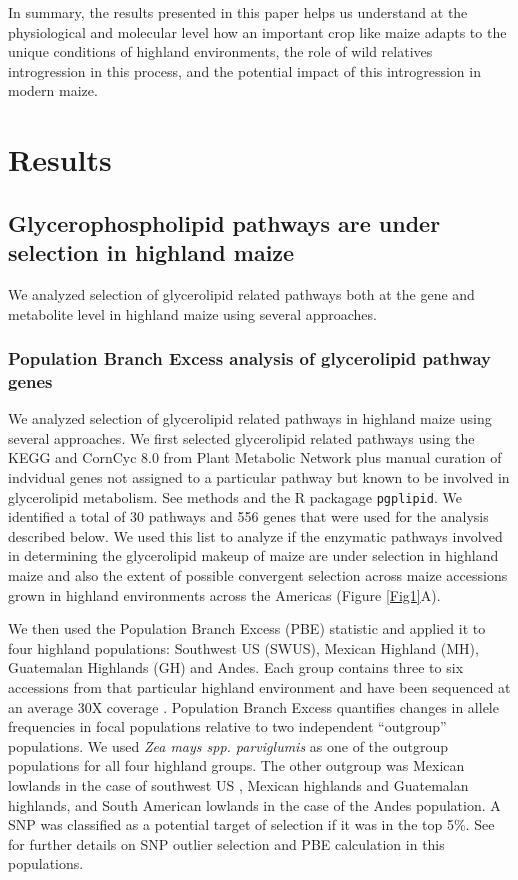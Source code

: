 \documentclass[9pt,twocolumn,twoside,lineno]{gsajnl}
\begin{document}
In summary, the results presented in this paper helps us understand at the physiological and molecular level how an important crop like maize adapts to the unique conditions of highland environments, the role of wild relatives introgression in this process, and the potential impact of this introgression in modern maize.

\section{Results}
\label{sec:results}

\subsection{Glycerophospholipid pathways are under selection in  highland maize} 
We analyzed selection of glycerolipid related pathways both at the gene and metabolite level in highland maize using several approaches. 

\subsubsection{Population Branch Excess analysis of glycerolipid pathway genes} 
We analyzed selection of glycerolipid related pathways in highland maize using several approaches.
We first selected glycerolipid related pathways using the KEGG \citep{kanehisa2019} and CornCyc 8.0 from  Plant Metabolic Network \citep{Schlapfer2017-yl} plus manual curation of indvidual genes not assigned to a particular pathway but known to be involved in glycerolipid metabolism. See methods and the R packagage \verb|pgplipid|. 
We identified a total of 30 pathways and 556 genes that were used for the analysis described below. 
We used this list to analyze if the enzymatic pathways involved in determining the glycerolipid makeup of maize are under selection in highland maize and also the extent of possible convergent selection across maize accessions grown in highland environments across the Americas (Figure \ref{Fig1}A).  

We then used the Population Branch Excess (PBE) statistic \citep{Pool2017-oa} and applied it to four highland populations: Southwest US (SWUS), Mexican Highland (MH), Guatemalan Highlands (GH) and Andes. 
Each group contains three to six accessions from that particular highland environment and have been sequenced at an average 30X coverage \citep{Wang2017-bc, Wang2020-mp}. Population Branch Excess quantifies changes in allele frequencies in focal populations relative to two independent “outgroup” populations. 
We used \textit{Zea mays spp. parviglumis} as one of the outgroup populations for all four highland groups.  
The other outgroup was  Mexican lowlands  in the case of southwest US , Mexican highlands and Guatemalan highlands, and South American lowlands in the case of the Andes population. 
A SNP was classified as a potential target of selection if it was in the top 5\%. See \cite{Wang2020-mp} for further details on SNP outlier selection and PBE calculation in this populations. 
\end{document}
